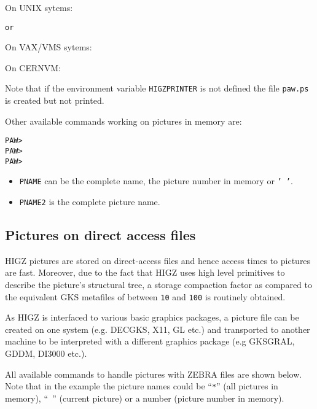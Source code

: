 On UNIX sytems:
\begin{alltt}
        or
\end{alltt}
On VAX/VMS sytems:
\begin{alltt}
\end{alltt}
On CERNVM:
\begin{alltt}
\end{alltt}

Note that if the environment variable \texttt{HIGZPRINTER} is not defined the
file \texttt{paw.ps} is created but not printed.


Other available commands working on pictures in memory are:

\begin{alltt}
PAW >   
PAW >     
PAW >          
\end{alltt}

\begin{itemize}
\item \texttt{PNAME} can be the complete name, the picture number in memory or \texttt{' '}.
\item \texttt{PNAME2} is the complete picture name.
\end{itemize}

\subsection{Pictures on direct access files}

HIGZ pictures are stored on direct-access files and hence
access times to pictures are fast. Moreover, due to the fact that
HIGZ uses high level primitives to describe the picture's structural
tree, a storage compaction factor as compared to the equivalent
GKS metafiles of between \texttt{10} and \texttt{100}
is routinely obtained.

As HIGZ is interfaced to various basic graphics packages, a picture
file can be created on one system (e.g. DECGKS, X11, GL etc.) and 
transported to another machine to be interpreted with a different graphics 
package (e.g GKSGRAL, GDDM, DI3000 etc.).

\newpage

All available commands to handle pictures with ZEBRA files are shown below.
Note that in the example the picture names could be ``\texttt{*}'' (all
pictures in memory), ``\texttt{ }'' (current picture) or a number
(picture number in memory).

